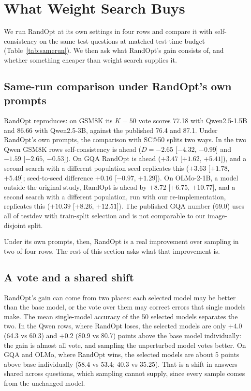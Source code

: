 \documentclass{article}
\makeatletter
\newcommand{\SC}{SC@50}
\makeatother
\begin{document}
\section{What Weight Search Buys}\label{sec:buys}
We run RandOpt at its own settings in four rows and compare it with self-consistency on the same test questions at
matched test-time budget (Table~\ref{tab:samerun}). We then ask what RandOpt's gain consists of, and whether something
cheaper than weight search supplies it.

\subsection{Same-run comparison under RandOpt's own prompts}\label{sec:samerun}
RandOpt reproduces: on GSM8K its $K{=}50$ vote scores 77.18 with Qwen2.5-1.5B and 86.66 with Qwen2.5-3B, against the
published 76.4 and 87.1. Under RandOpt's own prompts, the comparison with \SC{} splits two ways. In the two Qwen GSM8K
rows self-consistency is ahead ($D = -2.65$ [$-4.32$, $-0.99$] and $-1.59$ [$-2.65$, $-0.53$]). On GQA RandOpt is ahead
($+3.47$ [$+1.62$, $+5.41$]), and a second search with a different population seed replicates this ($+3.63$ [$+1.78$,
$+5.49$]; seed-to-seed difference $+0.16$ [$-0.97$, $+1.29$]). On OLMo-2-1B, a model outside the original study,
RandOpt is ahead by $+8.72$ [$+6.75$, $+10.77$], and a second search with a different population, run with our
re-implementation, replicates this ($+10.39$ [$+8.26$, $+12.51$]). The published GQA number (69.0) uses all of testdev
with train-split selection and is not comparable to our image-disjoint split.

Under its own prompts, then, RandOpt is a real improvement over sampling in two of four rows. The rest of this section
asks what that improvement is.

\subsection{A vote and a shared shift}\label{sec:decomp}
RandOpt's gain can come from two places: each selected model may be better than the base model, or the vote over them
may correct errors that single models make. The mean single-model accuracy of the 50 selected models separates the two.
In the Qwen rows, where RandOpt loses, the selected models are only $+4.0$ (64.3 vs 60.3) and $+0.2$ (80.9 vs 80.7)
points above the base model individually: the gain is almost all vote, and sampling the unperturbed model votes better.
On GQA and OLMo, where RandOpt wins, the selected models are about 5 points above base individually (58.4 vs 53.4; 40.3
vs 35.25). That is a shift in answers shared across questions, which sampling cannot supply, since every sample comes
from the unchanged model.
\end{document}
